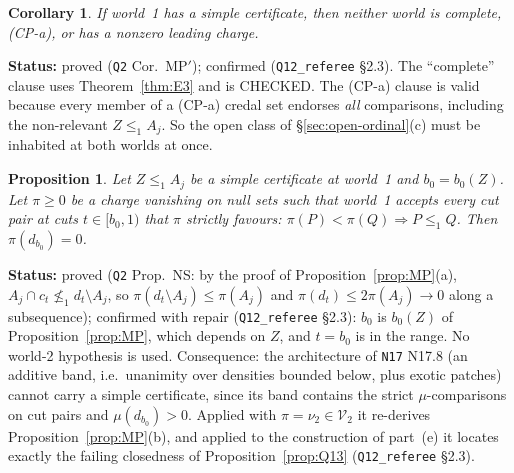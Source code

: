 \documentclass[11pt]{article}
\newtheorem{proposition}[theorem]{Proposition}
\newtheorem{corollary}[theorem]{Corollary}
\theoremstyle{definition}
\theoremstyle{remark}
\newcommand{\src}[1]{\texttt{#1}}
\newcommand{\status}[1]{\par\smallskip\noindent\textbf{Status:} #1\par\smallskip}
\begin{document}
\begin{corollary}\label{cor:MPprime}
If world~1 has a simple certificate, then neither world is complete, (CP-a), or has a nonzero leading charge.
\end{corollary}
\status{proved (\src{Q2} Cor.~MP$'$); confirmed (\src{Q12\_referee} \S2.3). The ``complete'' clause uses Theorem~\ref{thm:E3} and is CHECKED. The (CP-a) clause is valid because every member of a (CP-a) credal set endorses \emph{all} comparisons, including the non-relevant $Z\le_1A_j$. So the open class of \S\ref{sec:open-ordinal}(c) must be inhabited at both worlds at once.}

\begin{proposition}\label{prop:NS}
Let $Z\le_1A_j$ be a simple certificate at world~1 and $b_0=b_0(Z)$. Let $\pi\ge0$ be a charge vanishing on null sets such that world~1 accepts every cut pair at cuts $t\in[b_0,1)$ that $\pi$ strictly favours: $\pi(P)<\pi(Q)\Rightarrow P\le_1Q$. Then $\pi(d_{b_0})=0$.
\end{proposition}
\status{proved (\src{Q2} Prop.~NS: by the proof of Proposition~\ref{prop:MP}(a), $A_j\cap c_t\not\le_1d_t\setminus A_j$, so $\pi(d_t\setminus A_j)\le\pi(A_j)$ and $\pi(d_t)\le2\pi(A_j)\to0$ along a subsequence); confirmed with repair (\src{Q12\_referee} \S2.3): $b_0$ is $b_0(Z)$ of Proposition~\ref{prop:MP}, which depends on $Z$, and $t=b_0$ is in the range. No world-2 hypothesis is used. Consequence: the architecture of \src{N17} N17.8 (an additive band, i.e.\ unanimity over densities bounded below, plus exotic patches) cannot carry a simple certificate, since its band contains the strict $\mu$-comparisons on cut pairs and $\mu(d_{b_0})>0$. Applied with $\pi=\nu_2\in\mathcal V_2$ it re-derives Proposition~\ref{prop:MP}(b), and applied to the construction of part~(e) it locates exactly the failing closedness of Proposition~\ref{prop:Q13} (\src{Q12\_referee} \S2.3).}
\end{document}
